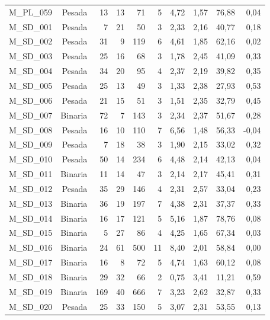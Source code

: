 \begin{table}[ht!]
\begin{tabular}{lrrrrrrrrr}
    M\_PL\_059 & Pesada & 13   & 13   & 71   & 5    & 4,72 & 1,57 & 76,88 & 0,04 \\
    M\_SD\_001 & Pesada & 7    & 21   & 50   & 3    & 2,33 & 2,16 & 40,77 & 0,18 \\
    M\_SD\_002 & Pesada & 31   & 9    & 119  & 6    & 4,61 & 1,85 & 62,16 & 0,02 \\
    M\_SD\_003 & Pesada & 25   & 16   & 68   & 3    & 1,78 & 2,45 & 41,09 & 0,33 \\
    M\_SD\_004 & Pesada & 34   & 20   & 95   & 4    & 2,37 & 2,19 & 39,82 & 0,35 \\
    M\_SD\_005 & Pesada & 25   & 13   & 49   & 3    & 1,33 & 2,38 & 27,93 & 0,53 \\
    M\_SD\_006 & Pesada & 21   & 15   & 51   & 3    & 1,51 & 2,35 & 32,79 & 0,45 \\
    M\_SD\_007 & Binaria & 72   & 7    & 143  & 3    & 2,34 & 2,37 & 51,67 & 0,28 \\
    M\_SD\_008 & Pesada & 16   & 10   & 110  & 7    & 6,56 & 1,48 & 56,33 & -0,04 \\
    M\_SD\_009 & Pesada & 7    & 18   & 38   & 3    & 1,90 & 2,15 & 33,02 & 0,32 \\
    M\_SD\_010 & Pesada & 50   & 14   & 234  & 6    & 4,48 & 2,14 & 42,13 & 0,04 \\
    M\_SD\_011 & Binaria & 11   & 14   & 47   & 3    & 2,14 & 2,17 & 45,41 & 0,31 \\
    M\_SD\_012 & Pesada & 35   & 29   & 146  & 4    & 2,31 & 2,57 & 33,04 & 0,23 \\
    M\_SD\_013 & Binaria & 36   & 19   & 197  & 7    & 4,38 & 2,31 & 37,37 & 0,33 \\
    M\_SD\_014 & Binaria & 16   & 17   & 121  & 5    & 5,16 & 1,87 & 78,76 & 0,08 \\
    M\_SD\_015 & Binaria & 5    & 27   & 86   & 4    & 4,25 & 1,65 & 67,34 & 0,03 \\
    M\_SD\_016 & Binaria & 24   & 61   & 500  & 11   & 8,40 & 2,01 & 58,84 & 0,00 \\
    M\_SD\_017 & Binaria & 16   & 8    & 72   & 5    & 4,74 & 1,63 & 60,12 & 0,08 \\
    M\_SD\_018 & Binaria & 29   & 32   & 66   & 2    & 0,75 & 3,41 & 11,21 & 0,59 \\
    M\_SD\_019 & Binaria & 169  & 40   & 666  & 7    & 3,23 & 2,62 & 32,87 & 0,33 \\
    M\_SD\_020 & Pesada & 25   & 33   & 150  & 5    & 3,07 & 2,31 & 53,55 & 0,13 \\

\end{tabular}
\end{table}
